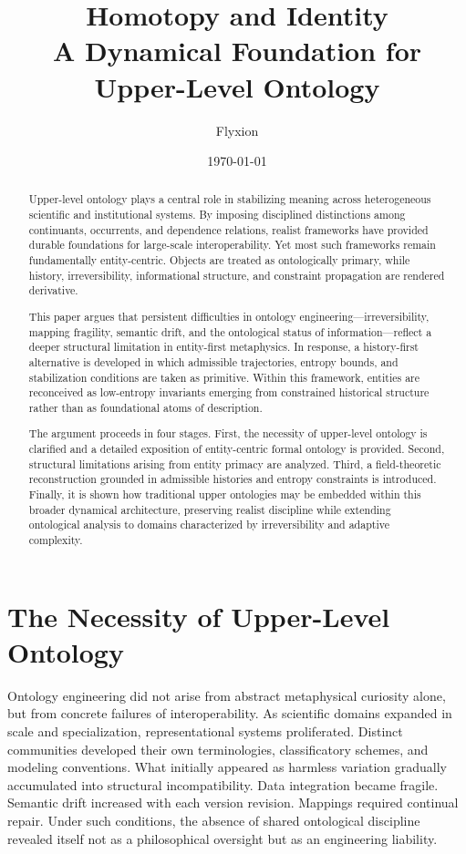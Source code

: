 \documentclass[12pt]{article}
\title{Homotopy and Identity\\
\large A Dynamical Foundation for Upper-Level Ontology}
\author{Flyxion}
\date{\today}
\begin{document}
\maketitle

\begin{abstract}

Upper-level ontology plays a central role in stabilizing meaning across heterogeneous scientific and institutional systems. By imposing disciplined distinctions among continuants, occurrents, and dependence relations, realist frameworks have provided durable foundations for large-scale interoperability. Yet most such frameworks remain fundamentally entity-centric. Objects are treated as ontologically primary, while history, irreversibility, informational structure, and constraint propagation are rendered derivative.

This paper argues that persistent difficulties in ontology engineering—irreversibility, mapping fragility, semantic drift, and the ontological status of information—reflect a deeper structural limitation in entity-first metaphysics. In response, a history-first alternative is developed in which admissible trajectories, entropy bounds, and stabilization conditions are taken as primitive. Within this framework, entities are reconceived as low-entropy invariants emerging from constrained historical structure rather than as foundational atoms of description.

The argument proceeds in four stages. First, the necessity of upper-level ontology is clarified and a detailed exposition of entity-centric formal ontology is provided. Second, structural limitations arising from entity primacy are analyzed. Third, a field-theoretic reconstruction grounded in admissible histories and entropy constraints is introduced. Finally, it is shown how traditional upper ontologies may be embedded within this broader dynamical architecture, preserving realist discipline while extending ontological analysis to domains characterized by irreversibility and adaptive complexity.

\end{abstract}

\newpage
\tableofcontents

\newpage
\section{The Necessity of Upper-Level Ontology}

Ontology engineering did not arise from abstract metaphysical curiosity alone, but from concrete failures of interoperability. As scientific domains expanded in scale and specialization, representational systems proliferated. Distinct communities developed their own terminologies, classificatory schemes, and modeling conventions. What initially appeared as harmless variation gradually accumulated into structural incompatibility. Data integration became fragile. Semantic drift increased with each version revision. Mappings required continual repair. Under such conditions, the absence of shared ontological discipline revealed itself not as a philosophical oversight but as an engineering liability.
\end{document}
